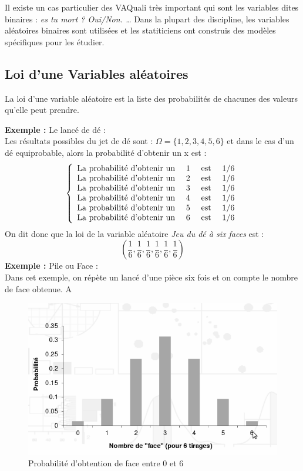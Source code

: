 Il existe un cas particulier des VAQuali très important qui sont les variables dites binaires : \textit{es tu mort ? Oui/Non. \dots} Dans la plupart des discipline, les variables aléatoires binaires sont utilisées et les statiticiens ont construis des modèles spécifiques pour les étudier.

\subsection{Loi d'une Variables aléatoires} 
La loi d'une variable aléatoire est la liste des probabilités de chacunes des valeurs qu'elle peut prendre. 

\textbf{Exemple : } Le lancé de dé : \newline
\\
Les résultats possibles du jet de dé sont : $\Omega = \{1,2,3,4,5,6\}$ et dans le cas d'un dé equiprobable, alors la probabilité d'obtenir un x est : 
$$
\left \{
\begin{array}{c  c  c  c}
    \textrm{La probabilité d'obtenir un } & 1 & \textrm{ est } & 1/6  \\
    \textrm{La probabilité d'obtenir un } & 2 & \textrm{ est } & 1/6  \\
    \textrm{La probabilité d'obtenir un } & 3 & \textrm{ est } & 1/6  \\
    \textrm{La probabilité d'obtenir un } & 4 & \textrm{ est } & 1/6  \\
    \textrm{La probabilité d'obtenir un } & 5 & \textrm{ est } & 1/6  \\
    \textrm{La probabilité d'obtenir un } & 6 & \textrm{ est } & 1/6  \\
\end{array}
\right.
$$
On dit donc que la loi de la variable aléatoire \textit{Jeu du dé à six faces} est :\newline
$$(\frac{1}{6},\frac{1}{6},\frac{1}{6},\frac{1}{6},\frac{1}{6},\frac{1}{6})$$
\textbf{Exemple : } Pile ou Face : \newline
\\
Dans cet exemple, on répète un lancé d'une pièce six fois et on compte le nombre de face obtenue.
A 
\begin{figure}[H]\begin{center}\includegraphics[scale=0.5]{ilu/g1.png}\caption{Probabilité d'obtention de face entre 0 et 6}\end{center}\end{figure}

